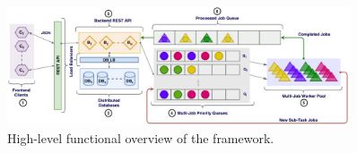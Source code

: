 \begin{figure}[h!]
  \centering
  \includegraphics[width=0.9\textwidth]{4_proposed_solution/web_app/figures/openpra_overview.png}
  \caption{High-level functional overview of the framework.}
  \label{fig:openpra_overview}
\end{figure}